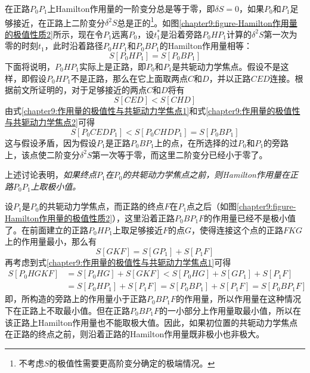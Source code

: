 在正路$P_0P_1$上Hamilton作用量的一阶变分总是等于零，即$\delta S=0$，如果$P_0$和$P_1$足够接近，在正路上二阶变分$\delta^2 S$总是正的\footnote{不考虑$S$的极值性需要更高阶变分确定的极端情况。}。如图\ref{chapter9:figure-Hamilton作用量的极值性质2}所示，现在令$P_1$远离$P_0$，设$t_1^*$是沿着旁路$P_0HP_1$计算的$\delta^2S$第一次为零的时刻$t_1$，此时沿着路径$P_0HP_1$和$P_0BP_1$的Hamilton作用量相等：
\begin{equation}
	S[P_0HP_1] = S[P_0BP_1]
	\label{chapter9:作用量的极值性与共轭动力学焦点1}
\end{equation}
下面将说明，$P_0HP_1$实际上是正路，即$P_0$和$P_1$是共轭动力学焦点。假设不是这样，即假设$P_0HP_1$不是正路，那么在它上面取两点$C$和$D$，并以正路$CED$连接。根据前文所证明的，对于足够接近的两点$C$和$D$将有
\begin{equation}
	S[CED]<S[CHD]
	\label{chapter9:作用量的极值性与共轭动力学焦点2}
\end{equation}
由式\eqref{chapter9:作用量的极值性与共轭动力学焦点1}和式\eqref{chapter9:作用量的极值性与共轭动力学焦点2}可得
\begin{equation}
	S[P_0CEDP_1] < S[P_0CHDP_1] = S[P_0BP_1]
\end{equation}
这与假设矛盾，因为假设$P_1$是正路$P_0BP_1$上的点，在所选择的过$P_0$和$P_1$的旁路上，该点使二阶变分$\delta^2 S$第一次等于零，而这里二阶变分已经小于零了。

上述讨论表明，{\it 如果终点$P_1$在$P_0$的共轭动力学焦点之前，则Hamilton作用量在正路$P_0P_1$上取极小值。}

设$P_1$是$P_0$的共轭动力学焦点，而正路的终点$F$在$P_1$点之后（如图\ref{chapter9:figure-Hamilton作用量的极值性质2}），这里沿着正路$P_0BP_1F$的作用量已经不是极小值了。在前面建立的正路$P_0HP_1$上取足够接近$F$的点$G$，使得连接这个点的正路$FKG$上的作用量最小，那么有
\begin{equation}
	S[GKF] = S[GP_1]+S[P_1F]
\end{equation}
再考虑到式\eqref{chapter9:作用量的极值性与共轭动力学焦点1}可得
\begin{align*}
	S[P_0HGKF] & = S[P_0HG]+S[GKF] < S[P_0HG]+S[GP_1]+S[P_1F] \\
	& = S[P_0HP_1] + S[P_1F] = S[P_0BP_1]+S[P_1F] = S[P_0BP_1F]
\end{align*}
即，所构造的旁路上的作用量小于正路$P_0BP_1F$的作用量，所以作用量在这种情况下在正路上不取最小值。但在正路$P_0BP_1F$的一小部分上作用量取最小值，所以在该正路上Hamilton作用量也不能取极大值。因此，如果初位置的共轭动力学焦点在正路的终点之前，则沿着正路的Hamilton作用量既非极小也非极大。

